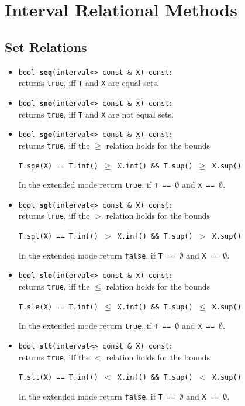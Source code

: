 \documentclass{report}
\begin{document}
\section{Interval Relational Methods}
\subsection{Set Relations}
\begin{itemize}
			\item \texttt{bool {\bf seq}(interval<> const \& X)
				const}:\\returns \texttt{true}, iff
				\texttt{T} and \texttt{X} are equal sets.

				
			\item \texttt{bool {\bf sne}(interval<> const \& X)
			const}:\\  returns \texttt{true}, iff
				\texttt{T} and \texttt{X} are not equal sets.

			\item \texttt{bool {\bf sge}(interval<> const \& X)
			const}:\\
returns  \texttt{true}, iff the $\geq$ relation holds for the bounds
				\begin{center} \texttt{T.sge(X) == T.inf() $\geq$ X.inf() \&\& T.sup() $\geq$ X.sup()} \end{center}

In the extended mode return \texttt{true}, if 
				\texttt{T == $\emptyset$} and \texttt{X == $\emptyset$}.
				
			\item \texttt{bool {\bf sgt}(interval<> const \& X) const}:\\ 
returns  \texttt{true}, iff the $>$ relation holds for the bounds				
\begin{center} \texttt{T.sgt(X) ==
				T.inf() $>$ X.inf() \&\& T.sup() $>$
				X.sup()} \end{center}

In the extended mode return \texttt{false}, if 
				\texttt{T == $\emptyset$} and \texttt{X == $\emptyset$}.
						
			\item \texttt{bool {\bf sle}(interval<> const \& X)
			const}:\\
returns  \texttt{true}, iff the $\leq$ relation holds for the bounds
				\begin{center} \texttt{T.sle(X) == T.inf() $\leq$ X.inf() \&\& T.sup() $\leq$ X.sup()} \end{center}

			In the extended mode return \texttt{true}, if 
				\texttt{T == $\emptyset$} and \texttt{X == $\emptyset$}.				
			\item \texttt{bool {\bf slt}(interval<> const \& X)
			const}:\\
returns  \texttt{true}, iff the $<$ relation holds for the bounds
				\begin{center} \texttt{T.slt(X) == T.inf() $<$ X.inf() \&\& T.sup() $<$ X.sup()} \end{center}

		In the extended mode return \texttt{false}, if 
				\texttt{T == $\emptyset$} and \texttt{X == $\emptyset$}.
\end{itemize}
\end{document}

